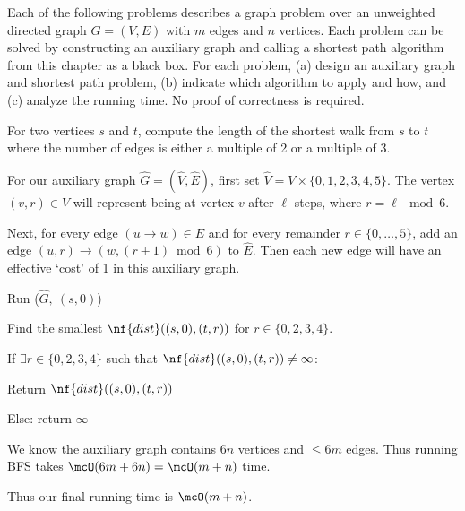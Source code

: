 \documentclass{article}
\begin{document}
 Each of the following problems describes a graph problem over an unweighted directed graph \( G = (V, E) \) with \( m \) edges and \( n \) vertices.
Each problem can be solved by constructing an auxiliary graph and calling a shortest path algorithm from this chapter as a black box.
For each problem, (a) design an auxiliary graph and shortest path problem, (b) indicate which algorithm to apply and how, and (c) analyze the running time.
No proof of correctness is required.
\setcounter{section}{7}
\setcounter{exercise}{1}
\setcounter{subexercise}{2}
\begin{subexercise} %
  For two vertices \( s \) and \( t \), compute the length of the shortest walk from \( s \) to \( t \) where the number of edges is either a multiple of 2 or a multiple of 3.
\end{subexercise}

\begin{solution}
\begin{enumerate}[label=(\alph*)]
  \item For our auxiliary graph \( \hat G=(\hat V,\hat E) \), first set \( \hat V =V\times\{0,1,2,3,4,5\} \).
  The vertex \( (v,r)\in\hat V \) will represent being at vertex \( v \) after \( \ell \) steps, where \( r = \ell\mod 6 \).

  Next, for every edge \( (u \to w)\in E \) and for every remainder \( r\in \{0,\dots,5\} \), add an edge \( (u, r)\to(w, (r+1)\bmod 6) \) to \( \hat E \).
  Then each new edge will have an effective `cost' of 1 in this auxiliary graph.
  \item {}
  \begin{steps}
    \item Run (\( \hat G,\ (s,0) \))
    \item Find the smallest \( \nf{dist}((s,0),(t,r)) \) for \( r \in \{0,2,3,4\} \).
    \item If \( \exists r\in\{0,2,3,4\} \) such that \( \nf{dist}((s,0),(t,r)) \neq \infty \): \begin{steps}
      \item Return \( \nf{dist}((s,0),(t,r)) \)
    \end{steps}
    \item Else: return \( \infty \)
  \end{steps}

  \item We know the auxiliary graph contains \( 6n \) vertices and \( \leq 6m \) edges. Thus running BFS takes \( \mcO(6m+6n) = \mcO(m+n) \) time.

  Thus our final running time is \( \mcO(m+n) \).
\end{enumerate}
\end{solution}
\pagebreak
\end{document}
